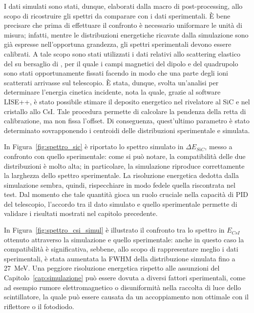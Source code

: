 I dati simulati sono stati, dunque, elaborati dalla macro di post-processing, allo scopo di ricostruire gli spettri  da comparare con i dati sperimentali.
È bene precisare che prima di effettuare il confronto è necessario uniformare le unità di misura; infatti, mentre le distribuzioni energetiche ricavate dalla simulazione sono già espresse nell'opportuna grandezza, gli spettri sperimentali devono essere calibrati.
A tale scopo sono stati utilizzati i dati relativi allo scattering elastico del  su bersaglio di , per il quale i campi magnetici del dipolo e del quadrupolo sono stati opportunamente fissati facendo  in modo che una parte degli ioni scatterati arrivasse sul telescopio.
È stata, dunque, svolta un'analisi per determinare l'energia cinetica incidente, nota la quale, grazie al software LISE++, è stato possibile stimare il deposito energetico nel rivelatore al SiC e nel cristallo allo CsI.
Tale procedura permette di calcolare la pendenza della retta di calibrazione, ma non fissa l'offset.
Di conseguenza, quest'ultimo parametro è stato determinato sovrapponendo i centroidi delle distribuzioni sperimentale e simulata.

In Figura~\ref{fig:spettro_sic} è riportato lo spettro simulato in $\Delta E_{SiC}$, messo a confronto con quello sperimentale: come si può notare, la compatibilità delle due distribuzioni è molto alta; in particolare, la simulazione riproduce correttamente la larghezza dello spettro sperimentale.
La risoluzione energetica dedotta dalla simulazione sembra, quindi, rispecchiare in modo fedele quella riscontrata nel test.
Dal momento che tale quantità gioca un ruolo cruciale nella capacità di PID del telescopio, l'accordo tra il dato simulato e quello sperimentale permette di validare i risultati mostrati nel capitolo precedente.


In Figura~\ref{fig:spettro_csi_simul} è illustrato il confronto tra lo spettro in $E_{CsI}$ ottenuto attraverso la simulazione e quello sperimentale: anche in questo caso la compatibilità è significativa, sebbene, allo scopo di rappresentare meglio i dati sperimentali, è stata aumentata la FWHM della distribuzione simulata fino a 27~MeV.
Una peggiore risoluzione energetica rispetto alle assunzioni del Capitolo~\ref{cap:simulazione} può essere dovuta a diversi fattori sperimentali, come ad esempio rumore elettromagnetico o disuniformità nella raccolta di luce dello scintillatore, la quale può essere causata da un accoppiamento non ottimale con il riflettore o il fotodiodo.


